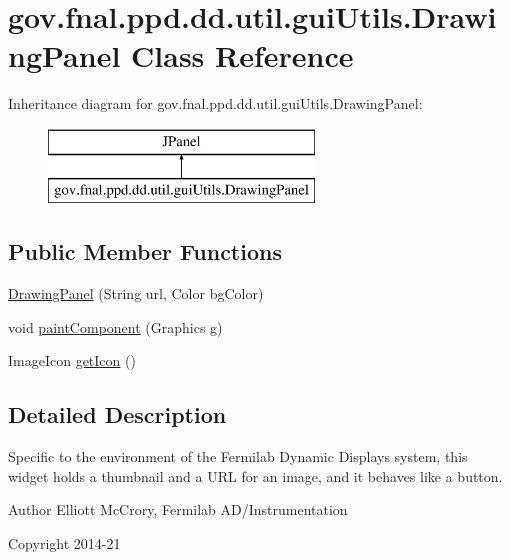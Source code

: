 \hypertarget{classgov_1_1fnal_1_1ppd_1_1dd_1_1util_1_1guiUtils_1_1DrawingPanel}{\section{gov.\-fnal.\-ppd.\-dd.\-util.\-gui\-Utils.\-Drawing\-Panel Class Reference}
\label{classgov_1_1fnal_1_1ppd_1_1dd_1_1util_1_1guiUtils_1_1DrawingPanel}
}
Inheritance diagram for gov.\-fnal.\-ppd.\-dd.\-util.\-gui\-Utils.\-Drawing\-Panel\-:\begin{figure}[H]
\begin{center}
\leavevmode
\includegraphics[height=2.000000cm]{classgov_1_1fnal_1_1ppd_1_1dd_1_1util_1_1guiUtils_1_1DrawingPanel}
\end{center}
\end{figure}
\subsection*{Public Member Functions}
\begin{DoxyCompactItemize}
\item 
\hyperlink{classgov_1_1fnal_1_1ppd_1_1dd_1_1util_1_1guiUtils_1_1DrawingPanel_a1584ddf035e111b02180a19949642966}{Drawing\-Panel} (String url, Color bg\-Color)
\item 
void \hyperlink{classgov_1_1fnal_1_1ppd_1_1dd_1_1util_1_1guiUtils_1_1DrawingPanel_ad854d2575bc2020948d871306f0d44c0}{paint\-Component} (Graphics g)
\item 
Image\-Icon \hyperlink{classgov_1_1fnal_1_1ppd_1_1dd_1_1util_1_1guiUtils_1_1DrawingPanel_ad2f449ee150fda74537d48b529a4467c}{get\-Icon} ()
\end{DoxyCompactItemize}


\subsection{Detailed Description}
Specific to the environment of the Fermilab Dynamic Displays system, this widget holds a thumbnail and a U\-R\-L for an image, and it behaves like a button.

\begin{DoxyAuthor}{Author}
Elliott Mc\-Crory, Fermilab A\-D/\-Instrumentation 
\end{DoxyAuthor}
\begin{DoxyCopyright}{Copyright}
2014-\/21 
\end{DoxyCopyright}


